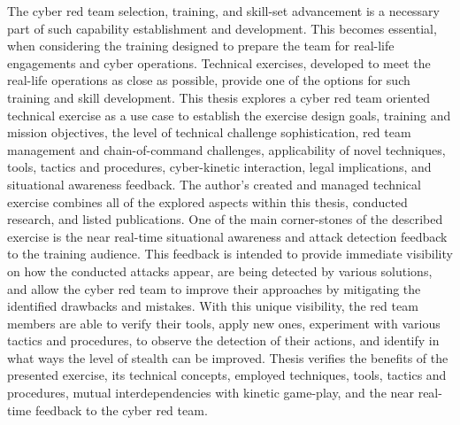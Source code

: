 The cyber red team selection, training, and skill-set advancement is a necessary part of such capability establishment and development. This becomes essential, when considering the training designed to prepare the team for real-life engagements and cyber operations. Technical exercises, developed to meet the real-life operations as close as possible, provide one of the options for such training and skill development. This thesis explores a cyber red team oriented technical exercise as a use case to establish the exercise design goals, training and mission objectives, the level of technical challenge sophistication, red team management and chain-of-command challenges, applicability of novel techniques, tools, tactics and procedures, cyber-kinetic interaction, legal implications, and situational awareness feedback. The author's created and managed technical exercise combines all of the explored aspects within this thesis, conducted research, and listed publications. One of the main corner-stones of the described exercise is the near real-time situational awareness and attack detection feedback to the training audience. This feedback is intended to provide immediate visibility on how the conducted attacks appear, are being detected by various solutions, and allow the cyber red team to improve their approaches by mitigating the identified drawbacks and mistakes. With this unique visibility, the red team members are able to verify their tools, apply new ones, experiment with various tactics and procedures, to observe the detection of their actions, and identify in what ways the level of stealth can be improved. Thesis verifies the benefits of the presented exercise, its technical concepts, employed techniques, tools, tactics and procedures, mutual interdependencies with kinetic game-play, and the near real-time feedback to the cyber red team.

